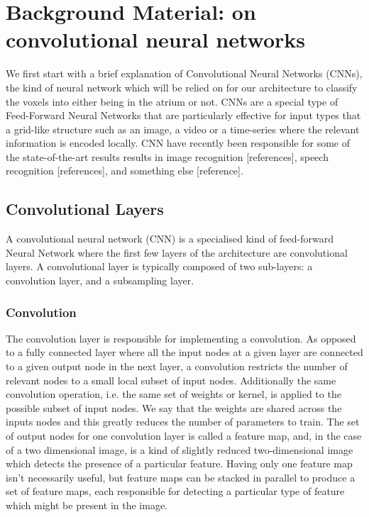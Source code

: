 \chapter{Background Material: on convolutional neural networks}

We first start with a brief explanation of Convolutional Neural Networks (CNNs), the kind of neural network which will be relied on for our architecture to classify the voxels into either being in the atrium or not. CNNs are a special type of Feed-Forward Neural Networks that are particularly effective for input types that a grid-like structure such as an image, a video or a time-series where the relevant information is encoded locally. CNN have recently been responsible for some of the state-of-the-art results results in image recognition [references], speech recognition [references], and something else [reference].

\section{Convolutional Layers}

A convolutional neural network (CNN) is a specialised kind of feed-forward Neural Network where the first few layers of the architecture are convolutional layers. A convolutional layer is typically composed of two sub-layers: a convolution layer, and a subsampling layer.

\subsection{Convolution}

The convolution layer is responsible for implementing a convolution. As opposed to a fully connected layer where all the input nodes at a given layer are connected to a given output node in the next layer, a convolution restricts the number of relevant nodes to a small local subset of input nodes. Additionally the same convolution operation, i.e. the same set of weights or kernel, is applied to the possible subset of input nodes. We say that the weights are shared across the inputs nodes and this greatly reduces the number of parameters to train. The set of output nodes for one convolution layer is called a feature map, and, in the case of a two dimensional image, is a kind of slightly reduced two-dimensional image which detects the presence of a particular feature. Having only one feature map isn't necessarily useful, but feature maps can be stacked in parallel to produce a set of feature maps, each responsible for detecting a particular type of feature which might be present in the image.

